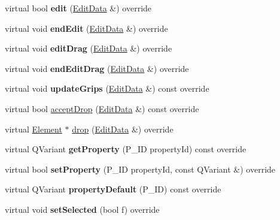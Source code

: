 \begin{DoxyCompactItemize}
virtual bool {\bfseries edit} (\hyperlink{class_ms_1_1_edit_data}{Edit\+Data} \&) override
\item 
\mbox{\label{class_ms_1_1_bracket_adcb9a9be31b7039546b345dbe0487ced}} 
virtual void {\bfseries end\+Edit} (\hyperlink{class_ms_1_1_edit_data}{Edit\+Data} \&) override
\item 
\mbox{\label{class_ms_1_1_bracket_a84617e1596f5428728d4f031f4d6f82e}} 
virtual void {\bfseries edit\+Drag} (\hyperlink{class_ms_1_1_edit_data}{Edit\+Data} \&) override
\item 
\mbox{\label{class_ms_1_1_bracket_aad32cba64f5418135f7b5a2baf637958}} 
virtual void {\bfseries end\+Edit\+Drag} (\hyperlink{class_ms_1_1_edit_data}{Edit\+Data} \&) override
\item 
\mbox{\label{class_ms_1_1_bracket_a299289b8c7e53bdb9f3e3ab1717b06af}} 
virtual void {\bfseries update\+Grips} (\hyperlink{class_ms_1_1_edit_data}{Edit\+Data} \&) const override
\item 
virtual bool \hyperlink{class_ms_1_1_bracket_aaa614e8c10e3b8106c21b8f54f1f2530}{accept\+Drop} (\hyperlink{class_ms_1_1_edit_data}{Edit\+Data} \&) const override
\item 
virtual \hyperlink{class_ms_1_1_element}{Element} $\ast$ \hyperlink{class_ms_1_1_bracket_a09f6e7e760bff48faef75b12db95755e}{drop} (\hyperlink{class_ms_1_1_edit_data}{Edit\+Data} \&) override
\item 
\mbox{\label{class_ms_1_1_bracket_a78bf50a43b92527dee6cfef01be7863f}} 
virtual Q\+Variant {\bfseries get\+Property} (P\+\_\+\+ID property\+Id) const override
\item 
\mbox{\label{class_ms_1_1_bracket_ad04b643c641d18e7606bc8ae96e6de05}} 
virtual bool {\bfseries set\+Property} (P\+\_\+\+ID property\+Id, const Q\+Variant \&) override
\item 
\mbox{\label{class_ms_1_1_bracket_ab84cc73a2f3a24afee201a615ca0d802}} 
virtual Q\+Variant {\bfseries property\+Default} (P\+\_\+\+ID) const override
\item 
\mbox{\label{class_ms_1_1_bracket_a2d98d540b1fc1445740f9148131753e1}} 
virtual void {\bfseries set\+Selected} (bool f) override
\end{DoxyCompactItemize}
